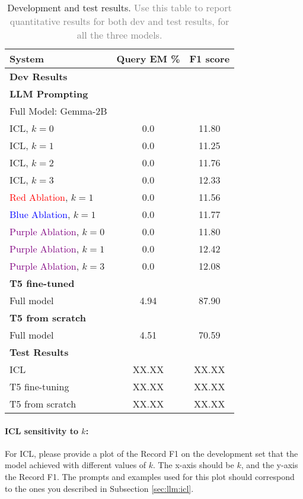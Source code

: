 \documentclass{article}
\begin{document}
\begin{table}[h!]
\centering
\begin{tabular}{lcc}
  \toprule
  System & Query EM \% & F1 score\\
  \midrule
  \multicolumn{3}{l}{\textbf{Dev Results}} \\
  \midrule
  \multicolumn{3}{l}{\textbf{LLM Prompting}} \\
	Full Model: Gemma-2B &  &  \\ 
	ICL, $k=0$ & 0.0 & 11.80 \\
	ICL, $k=1$ & 0.0 & 11.25 \\
	ICL, $k=2$ & 0.0 & 11.76 \\
	ICL, $k=3$ & 0.0 & 12.33 \\
	\textcolor{Red}{Red Ablation}, $k=1$ & 0.0 & 11.56 \\
	\textcolor{Blue}{Blue Ablation}, $k=1$ & 0.0 & 11.77 \\
	\textcolor{Purple}{Purple Ablation}, $k=0$ & 0.0 & 11.80 \\
	\textcolor{Purple}{Purple Ablation}, $k=1$ & 0.0 & 12.42 \\
	\textcolor{Purple}{Purple Ablation}, $k=3$ & 0.0 & 12.08 \\
	
  \multicolumn{3}{l}{\textbf{T5 fine-tuned}} \\
  Full model & 4.94 & 87.90 \\[5pt]

  \multicolumn{3}{l}{\textbf{T5 from scratch}} \\
  Full model & 4.51 & 70.59 \\ 

  \midrule
  \multicolumn{3}{l}{\textbf{Test Results}} \\
  \midrule
  ICL & XX.XX & XX.XX \\ 
  T5 fine-tuning & XX.XX & XX.XX \\
  T5 from scratch & XX.XX & XX.XX \\
  \bottomrule
\end{tabular}  
\caption{Development and test results. \textcolor{gray}{Use this table to report quantitative results for both dev and test results, for all the three models.}}
\label{tab:results}
\end{table}


\paragraph{ICL sensitivity to $k$:} For ICL, please provide a plot of the Record F1 on the development set that the model achieved with different values of $k$. The x-axis should be $k$, and the y-axis the Record F1. The prompts and examples used for this plot should correspond to the ones you described in Subsection \ref{sec:llm:icl}.
\end{document}
